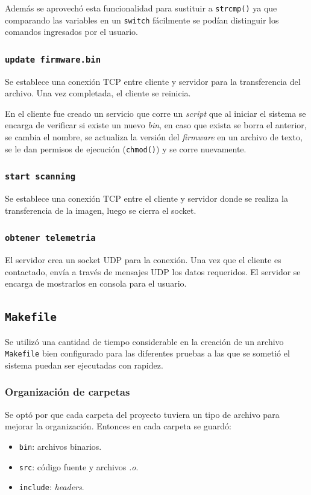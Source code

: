\documentclass[14.5pt,a4paper]{article}
\begin{document}
Además se aprovechó esta funcionalidad para sustituir a \texttt{strcmp()} ya que comparando las variables en un \texttt{switch} fácilmente se podían distinguir los comandos ingresados por el usuario.

\subsubsection{\texttt{update firmware.bin}}
Se establece una conexión TCP entre cliente y servidor para la transferencia del archivo. Una vez completada, el cliente se reinicia.

En el cliente fue creado un servicio que corre un \textit{script} que al iniciar el sistema se encarga de verificar si existe un nuevo \textit{bin}, en caso que exista se borra el anterior, se cambia el nombre, se actualiza la versión del \textit{firmware} en un archivo de texto, se le dan permisos de ejecución (\texttt{chmod()}) y se corre nuevamente.

\subsubsection{\texttt{start scanning}}
Se establece una conexión TCP entre el cliente y servidor donde se realiza la transferencia de la imagen, luego se cierra el socket.

\subsubsection{\texttt{obtener telemetria}}
El servidor crea un socket UDP para la conexión. Una vez que el cliente es contactado, envía a través de mensajes UDP los datos requeridos. El servidor se encarga de mostrarlos en consola para el usuario.

\subsection{\texttt{Makefile}}
Se utilizó una cantidad de tiempo considerable en la creación de un archivo \texttt{Makefile} bien configurado para las diferentes pruebas a las que se sometió el sistema puedan ser ejecutadas con rapidez.

\subsubsection{Organización de carpetas}
Se optó por que cada carpeta del proyecto tuviera un tipo de archivo para mejorar la organización.
Entonces en cada carpeta se guardó:
\begin{itemize}
	\item \texttt{bin}: archivos binarios.
	\item \texttt{src}: código fuente y archivos \textit{.o}.
	\item \texttt{include}: \textit{headers}.
\end{itemize}
\end{document}
